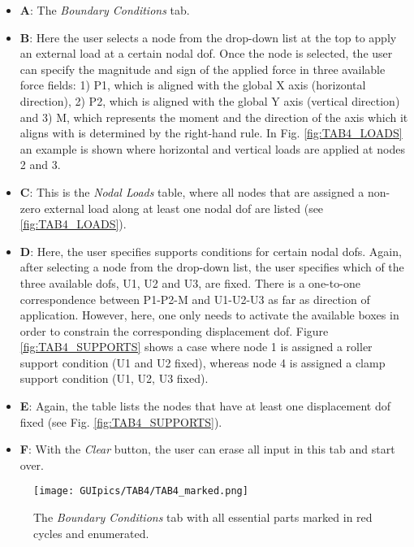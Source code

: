 \begin{itemize}
	\item \textbf{A}: The \textit{Boundary Conditions} tab.
	\item \textbf{B}: Here the user selects a node from the drop-down list at 
	the top to apply an external load at a certain nodal \acrshort{dof}. Once 
	the node is selected, the user can specify the magnitude and sign of the 
	applied force in three available force fields: 1) P1, which is aligned with 
	the global X axis (horizontal direction), 2) P2, which is aligned with the 
	global Y axis (vertical direction) and 3) M, which represents the moment 
	and the direction of the axis which it aligns with is determined by the 
	right-hand rule. In Fig. \ref{fig:TAB4_LOADS} an example is shown where 
	horizontal and vertical loads are applied at nodes 2 and 3.
	\item \textbf{C}: This is the \textit{Nodal Loads} table, where all nodes 
	that are assigned a non-zero external load along at least one nodal 
	\acrshort{dof} are listed (see \ref{fig:TAB4_LOADS}).
	
	\item \textbf{D}: Here, the user specifies supports conditions for certain 
	nodal \acrshort{dof}s. Again, after selecting a node from the drop-down 
	list, the user specifies which of the three available \acrshort{dof}s, U1, 
	U2 and U3, are fixed. There is a one-to-one correspondence between P1-P2-M 
	and U1-U2-U3 as far as direction of application. However, here, one only 
	needs to activate the available boxes in order to constrain the 
	corresponding displacement \acrshort{dof}. Figure \ref{fig:TAB4_SUPPORTS} 
	shows a case where node 1 is assigned a roller support condition (U1 and U2 
	fixed), whereas node 4 is assigned a clamp support condition (U1, U2, U3 
	fixed).
	\item \textbf{E}: Again, the table lists the nodes that have at least one 
	displacement \acrshort{dof} fixed (see Fig. \ref{fig:TAB4_SUPPORTS}).
	
	\item \textbf{F}: With the \textit{Clear} button, the user can erase all 
	input in this tab and start over.
\end{itemize}


\begin{figure}
	\centering
	\texttt{[image: GUIpics/TAB4/TAB4\_marked.png]}
	\caption{The \textit{Boundary Conditions} tab with all essential parts 
	marked in red cycles and enumerated.}
	\label{fig:TAB4_marked}
\end{figure}

